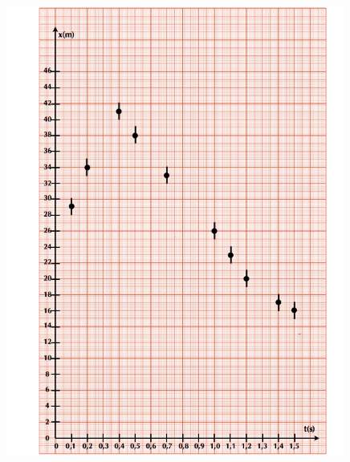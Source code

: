 \begin{figure}[t]
\vspace{0.5cm}
\begin{minipage}{\textwidth}
\begin{minipage}[t]{0.47\textwidth}
 \begin{center}
 \includegraphics*[width=0.99\textwidth]{fig/Plot1}
\end{center}
\end{minipage}
\begin{minipage}[t]{0.47\textwidth}
\begin{center}

\end{center}
\end{minipage}
\end{minipage}
\end{figure}
